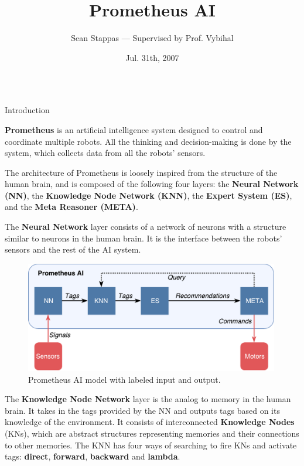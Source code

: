 \documentclass[final]{beamer} %
\title[Fancy Posters]{Prometheus AI}
\author{Sean Stappas --- Supervised by Prof. Vybihal}
\institute[RWTH Aachen University]{}
\date{Jul. 31th, 2007}
\newlength{\columnheight}
\begin{document}
	\begin{frame}
		\begin{columns}
			\begin{column}{.33\textwidth}
				\parbox[t][\columnheight]{\textwidth}{
				\begin{block}{Introduction}
					\parbox{0.99\textwidth}{
						\textbf{Prometheus} is an artificial intelligence system designed to control and coordinate multiple robots. All the thinking and decision-making is done by the system, which collects data from all the robots' sensors.
						
						The architecture of Prometheus is loosely inspired from the structure of the human brain, and is composed of the following four layers: the \textbf{Neural Network (NN)}, the \textbf{Knowledge Node Network (KNN)}, the \textbf{Expert System (ES)}, and the \textbf{Meta Reasoner (META)}.
					
						The \textbf{Neural Network} layer consists of a network of neurons with a structure similar to neurons in the human brain. It is the interface between the robots' sensors and the rest of the AI system.}
				
					\begin{figure}[!htb]
						\includegraphics[width=0.99\textwidth]{figures/ai_model_labeled.pdf}
						\caption{Prometheus AI model with labeled input and output.}
						\label{model_labeled}
					\end{figure}
				
					\parbox{0.99\textwidth}{The \textbf{Knowledge Node Network} layer is the analog to memory in the human brain. It takes in the tags provided by the NN and outputs tags based on its knowledge of the environment. It consists of interconnected \textbf{Knowledge Nodes} (KNs), which are abstract structures representing memories and their connections to other memories. The KNN has four ways of searching to fire KNs and activate tags: \textbf{direct}, \textbf{forward}, \textbf{backward} and \textbf{lambda}.}
					

\end{block}}
\end{column}
\end{columns}
\end{frame}
\end{document}
